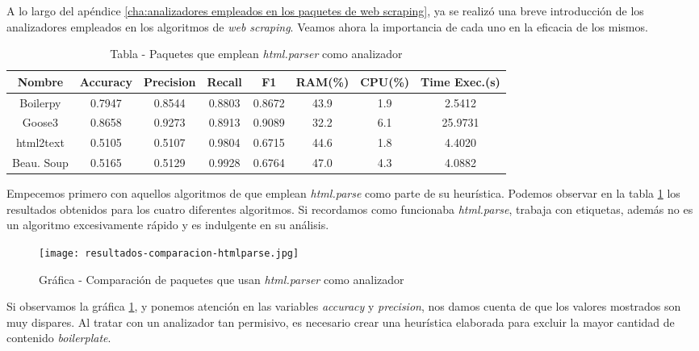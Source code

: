 A lo largo del apéndice \ref{cha:analizadores empleados en los paquetes de web scraping}, ya se realizó una 
breve introducción de los analizadores empleados en los algoritmos de \emph{web scraping}. Veamos ahora la
importancia de cada uno en la eficacia de los mismos.

\begin{table}[h]
    \begin{center}
      \begin{tabular}{| c | c | c | c | c | c | c | c |} \hline 
       \textbf{Nombre} & \textbf{Accuracy} & \textbf{Precision}  & \textbf{Recall} & \textbf{F1} & \textbf{RAM(\%)} & \textbf{CPU(\%)} & \textbf{Time Exec.(s)} \\ \hline
       Boilerpy & 0.7947 & 0.8544 & 0.8803 & 0.8672 & 43.9 & 1.9 & 2.5412 \\ \hline
       Goose3 & 0.8658 & 0.9273 & 0.8913 & 0.9089 & 32.2 & 6.1 & 25.9731 \\ \hline
       html2text & 0.5105 & 0.5107 & 0.9804 & 0.6715 & 44.6 & 1.8 & 4.4020 \\ \hline
       Beau. Soup & 0.5165 & 0.5129 & 0.9928 & 0.6764 & 47.0 & 4.3 & 4.0882 \\ \hline
      \end{tabular}
      \caption{Tabla - Paquetes que emplean \emph{html.parser} como analizador}
      \label{tab:tabla - paquetes que emplean html.parser como analizador}
    \end{center}
\end{table}

Empecemos primero con aquellos algoritmos de que emplean \emph{html.parse} como parte de su heurística.
Podemos observar en la tabla \ref{tab:tabla - paquetes que emplean html.parser como analizador} los
resultados obtenidos para los cuatro diferentes algoritmos. Si recordamos como funcionaba \emph{html.parse},
trabaja con etiquetas, además no es un algoritmo excesivamente rápido y es indulgente en su análisis.

\begin{figure}[tphb]
    \centering
    \texttt{[image: resultados-comparacion-htmlparse.jpg]}
    \caption{Gráfica - Comparación de paquetes que usan \emph{html.parser} como analizador}
    \label{img:grafica - comparacion de paquetes que usan html.parser como analizador}
\end{figure}

Si observamos la gráfica \ref{img:grafica - comparacion de paquetes que usan html.parser como analizador},
y ponemos atención en las variables \emph{accuracy} y \emph{precision}, nos damos cuenta de que los valores
mostrados son muy dispares. Al tratar con un analizador tan permisivo, es necesario crear una heurística
elaborada para excluir la mayor cantidad de contenido \emph{boilerplate}.

